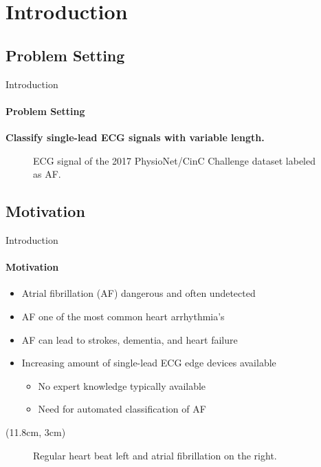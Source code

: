 \section{Introduction}

\subsection{Problem Setting}
\begin{frame}[c]{Introduction}
\framesubtitle{Problem Setting}
    \begin{center}
        \begin{large}
            \textbf{Classify single-lead ECG signals with variable length.}
        \end{large}
    \end{center}
    \vspace{0.5cm}
    \begin{figure}[!ht]
        \setlength{\figH}{3.75cm}
        \setlength{\figW}{0.95\textwidth}
        \centering
        
        \caption{ECG signal of the 2017 PhysioNet/CinC Challenge dataset \cite{Clifford2017} labeled as AF.}
        \label{fig:ecg_signal_A}
    \end{figure}
\end{frame}

\subsection{Motivation}
\begin{frame}{Introduction}
\framesubtitle{Motivation}
    \begin{itemize}
        \item Atrial fibrillation (AF) dangerous and often undetected
        \item AF one of the most common heart arrhythmia's
        \item AF can lead to strokes, dementia, and heart failure
        \item Increasing amount of single-lead ECG edge devices available
        \begin{itemize}
            \item No expert knowledge typically available
            \item Need for automated classification of AF
        \end{itemize}
    \end{itemize}
    \begin{textblock*}{3cm}(11.8cm, 3cm)
        \raggedright
        \cite{Becker2006}
        \cite{Herold2019}
    \end{textblock*}
    \pause
    \begin{figure}[!ht] 
        \centering
        
        \vspace{-0.15cm}
        \caption{Regular heart beat left and atrial fibrillation on the right.}
        \label{fig:beat}
    \end{figure}
\end{frame}

